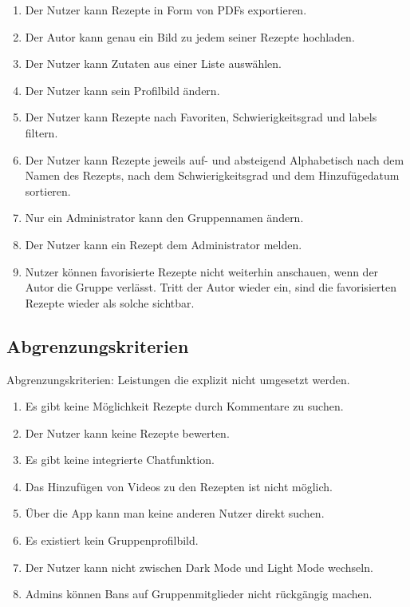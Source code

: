 \documentclass[parskip=full]{scrartcl}
\begin{document}
\begin{enumerate}[start=1,label={$\langle$\bfseries RC\arabic*$\rangle$}, leftmargin = 5em, itemsep=4pt, parsep=4pt]
    \item Der Nutzer kann Rezepte in Form von PDFs exportieren.\label{rc:PDFExport}
    \item Der Autor kann genau ein Bild zu jedem seiner Rezepte hochladen.\label{rc:Images}
    \item Der Nutzer kann Zutaten aus einer Liste auswählen.\label{rc:IngredientList}
    \item Der Nutzer kann sein Profilbild ändern.\label{rc:ProfileImage}
    \item Der Nutzer kann Rezepte nach Favoriten, Schwierigkeitsgrad und \Gls{labels} filtern.\label{rc:Filtering}
    \item Der Nutzer kann Rezepte jeweils auf- und absteigend Alphabetisch nach dem Namen des Rezepts, nach dem Schwierigkeitsgrad und dem Hinzufügedatum sortieren.\label{rc:Sorting}
    \item Nur ein Administrator kann den Gruppennamen ändern.\label{rc:GroupRenaming}
    \item Der Nutzer kann ein Rezept dem Administrator melden.\label{rc:RecipeMelden}
    \item Nutzer können favorisierte Rezepte nicht weiterhin anschauen, wenn der Autor die Gruppe verlässt. Tritt der Autor wieder ein, sind die favorisierten Rezepte wieder als solche sichtbar.\label{rc:FavoriteAuthorRejoin}

\end{enumerate}

\subsection{Abgrenzungskriterien}
Abgrenzungskriterien: Leistungen die explizit nicht umgesetzt werden.

\begin{enumerate}[start=1,label={$\langle$\bfseries RW\arabic*$\rangle$}, leftmargin = 5em, itemsep=4pt, parsep=4pt]
    \item Es gibt keine Möglichkeit Rezepte durch Kommentare zu suchen.
    \item Der Nutzer kann keine Rezepte bewerten.
    \item Es gibt keine integrierte Chatfunktion.
    \item Das Hinzufügen von Videos zu den Rezepten ist nicht möglich.
    \item Über die App kann man keine anderen Nutzer direkt suchen.
    \item Es existiert kein Gruppenprofilbild.
    \item Der Nutzer kann nicht zwischen Dark Mode und Light Mode wechseln.
    \item Admins können Bans auf Gruppenmitglieder nicht rückgängig machen.
\end{enumerate}
\end{document}
